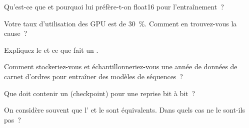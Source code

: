 \begin{interviewq}\label{iq:ml:training-infrastructure:1}
Qu'est-ce que  et pourquoi lui préfère-t-on float16 pour l'entraînement~?
\end{interviewq}

\begin{interviewq}\label{iq:ml:training-infrastructure:2}
Votre taux d'utilisation des GPU est de 30~\%. Comment en trouvez-vous la cause~?
\end{interviewq}

\begin{interviewq}\label{iq:ml:training-infrastructure:3}
Expliquez le  et ce que fait un .
\end{interviewq}

\begin{interviewq}\label{iq:ml:training-infrastructure:4}
Comment stockeriez-vous et échantillonneriez-vous une année de données de carnet d'ordres pour entraîner des modèles de séquences~?
\end{interviewq}

\begin{interviewq}\label{iq:ml:training-infrastructure:5}
Que doit contenir un  (checkpoint) pour une reprise bit à bit~?
\end{interviewq}

\begin{interviewq}\label{iq:ml:training-infrastructure:6}
On considère souvent que l' et le  sont équivalents. Dans quels cas ne le sont-ils pas~?
\end{interviewq}

